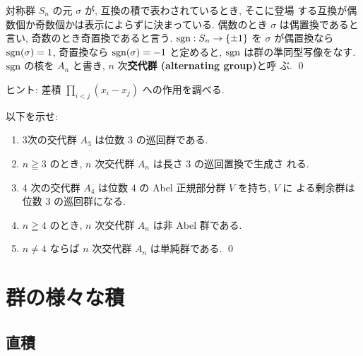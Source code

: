 \documentclass[12pt,twoside]{jarticle}
\def\Sym{S}
\def\Alt{A}
\def\sign{\mathop{\text{\rm sgn}}\nolimits}
\begin{document}
\begin{question}
  対称群 $\Sym_n$ の元 $\sigma$ が, 互換の積で表わされているとき, そこに登場
  する互換が偶数個か奇数個かは表示によらずに決まっている. 
  偶数のとき $\sigma$ は偶置換であると言い, 奇数のとき奇置換であると言う. 
  $\sign:\Sym_n\to\{\pm1\}$ を $\sigma$ が偶置換なら $\sign(\sigma)=1$,
  奇置換なら $\sign(\sigma)=-1$ と定めると, $\sign$ は群の準同型写像をなす.
  $\sign$ の核を $\Alt_n$ と書き, $n$ 次{\bf 交代群 (alternating group)}と呼
  ぶ. 
  \qed
\end{question}

\noindent ヒント: 差積 $\prod_{i<j}(x_i-x_j)$ への作用を調べる. 

\begin{question}
  以下を示せ:
  \begin{enumerate}
  \item 3次の交代群 $\Alt_3$ は位数 3 の巡回群である.
  \item $n\geqq3$ のとき, $n$ 次交代群 $\Alt_n$ は長さ 3 の巡回置換で生成さ
    れる.
  \item 4 次の交代群 $\Alt_4$ は位数 4 の Abel 正規部分群 $V$ を持ち, $V$ に
    よる剰余群は位数 3 の巡回群になる.
  \item $n\geqq4$ のとき, $n$ 次交代群 $\Alt_n$ は非 Abel 群である. 
  \item $n\ne4$ ならば $n$ 次交代群 $\Alt_n$ は単純群である. 
    \qed
  \end{enumerate}
\end{question}



\section{群の様々な積}


\subsection{直積}
\label{sec:direct-product}
\end{document}
